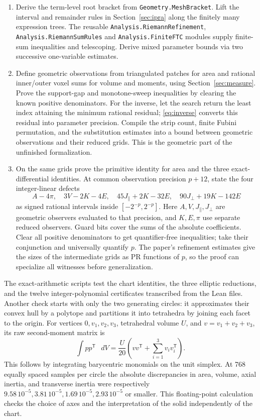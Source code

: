 \documentclass[11pt,letterpaper]{article}
\newcommand{\subt}[1]{\par\medskip\noindent{\color{sea}\bfseries #1}\enspace}
\newcommand{\dd}{\mathop{}\!d}
\newcommand{\ax}{\parallel}\newcommand{\tr}{\perp}
\begin{document}
\begin{enumerate}[leftmargin=1.5em,itemsep=4pt]
\item Derive the term-level root bracket from \texttt{Geometry.MeshBracket}. Lift the interval and remainder rules in Section~\ref{sec:ipra} along the finitely many expression trees. The reusable \texttt{Analysis.RiemannRefinement}, \texttt{Analysis.RiemannSumRules} and \texttt{Analysis.FiniteFTC} modules supply finite-sum inequalities and telescoping. Derive mixed parameter bounds via two successive one-variable estimates.
\item Define geometric observations from triangulated patches for area and rational inner/outer voxel sums for volume and moments, using Section~\ref{sec:measure}. Prove the support-gap and monotone-sweep inequalities by clearing the known positive denominators. For the inverse, let the search return the least index attaining the minimum rational residual; \eqref{eq:inverse} converts this residual into parameter precision. Compile the strip count, finite Fubini permutation, and the substitution estimates into a bound between geometric observations and their reduced grids. This is the geometric part of the unfinished formalization.
\item On the same grids prove the primitive identity for area and the three exact-differential identities. At common observation precision \(p+12\), state the four integer-linear defects
\[
 A-4\pi,\quad 3V-2K-4E,\quad 45J_\ax+2K-32E,\quad
 90J_\tr+19K-142E
\]
as signed rational intervals inside \([-2^{-p},2^{-p}]\). Here \(A,V,J_\ax,J_\tr\) are geometric observers evaluated to that precision, and \(K,E,\pi\) use separate reduced observers. Guard bits cover the sums of the absolute coefficients. Clear all positive denominators to get quantifier-free inequalities; take their conjunction and universally quantify \(p\). The paper's refinement estimates give the sizes of the intermediate grids as PR functions of \(p\), so the proof can specialize all witnesses before generalization.
\end{enumerate}

\subt{Checks and implementation status.}
The exact-arithmetic scripts test the chart identities, the three elliptic reductions, and the twelve integer-polynomial certificates transcribed from the Lean files. Another check starts with only the two generating circles: it approximates their convex hull by a polytope and partitions it into tetrahedra by joining each facet to the origin. For vertices \(0,v_1,v_2,v_3\), tetrahedral volume \(U\), and \(v=v_1+v_2+v_3\), its raw second-moment matrix is
\[
 \int pp^{\mathsf T}\,\dd V=\frac{U}{20}
 \left(vv^{\mathsf T}+\sum_{i=1}^3 v_i v_i^{\mathsf T}\right).
\]
This follows by integrating barycentric monomials on the unit simplex. At 768 equally spaced samples per circle the absolute discrepancies in area, volume, axial inertia, and transverse inertia were respectively \(9.58\,10^{-5},3.81\,10^{-5},1.69\,10^{-5},2.93\,10^{-5}\) or smaller. This floating-point calculation checks the choice of axes and the interpretation of the solid independently of the chart.
\end{document}
